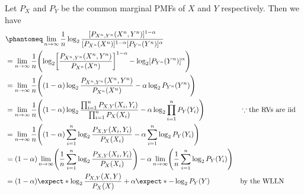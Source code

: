 \documentclass[
  coursecode={MTHE 474},
  assignmentname={Homework \homeworknumber},
  studentnumber=20053722,
  name={Bryan Hoang},
  draft,
]{
  ltxanswer%
}
\begin{document}
  \begin{questions}
    \setcounter{question}{\questionnumber}
    \addtocounter{question}{-1}
    \question[10]\
    \begin{parts}
      \part{}
      \begin{solution}
        Let \(P_{X}\) and \(P_{Y}\) be the common marginal PMFs of \(X\) and \(Y\) respectively. Then we have
        \begin{align*}
                       &\phantomeq \lim_{n\to\infty} \frac{1}{n} \log_{2} \frac{[P_{X^{n},Y^{n}}(X^{n},Y^{n})]^{1-\alpha}}{[P_{X^{n}}(X^{n})]^{1-\alpha}[P_{Y^{n}}(Y^{n})]^{\alpha}}                                                                                            \\
                       &= \lim_{n\to\infty} \frac{1}{n} \Biggl(\log_{2} \biggl[\frac{P_{X^{n},Y^{n}}(X^{n},Y^{n})}{P_{X^{n}}(X^{n})}\biggr]^{1-\alpha} - \log_{2} [P_{Y^{n}}(Y^{n})]^{\alpha}\Biggr)                                                                            \\
                       &= \lim_{n\to\infty} \frac{1}{n} \Biggl((1-\alpha) \log_{2} \frac{P_{X^{n},Y^{n}}(X^{n},Y^{n})}{P_{X^{n}}(X^{n})} - \alpha \log_{2} P_{Y^{n}}(Y^{n})\Biggr)                                                                                              \\
                       &= \lim_{n\to\infty} \frac{1}{n} \Biggl((1-\alpha) \log_{2} \frac{\prod_{i=1}^{n} P_{X,Y}(X_{i},Y_{i})}{\prod_{i=1}^{n} P_{X}(X_{i})} - \alpha \log_{2} \prod_{i=1}^{n} P_{Y}(Y_{i})\Biggr)                           & &\because \text{the RVs are iid} \\
                       &= \lim_{n\to\infty} \frac{1}{n} \Biggl((1-\alpha) \sum_{i=1}^{n} \log_{2} \frac{P_{X,Y}(X_{i},Y_{i})}{P_{X}(X_{i})} - \alpha \sum_{i=1}^{n} \log_{2} P_{Y}(Y_{i})\Biggr)                                                                                \\
                       &= (1-\alpha) \lim_{n\to\infty} \Biggl(\frac{1}{n} \sum_{i=1}^{n} \log_{2} \frac{P_{X,Y}(X_{i},Y_{i})}{P_{X}(X_{i})}\Biggr) - \alpha \lim_{n\to\infty} \Biggl(\frac{1}{n} \sum_{i=1}^{n} \log_{2} P_{Y}(Y_{i})\Biggr)                                    \\
                       &= (1-\alpha) \expect*{\log_{2} \frac{P_{X,Y}(X,Y)}{P_{X}(X)}} + \alpha \expect*{-\log_{2} P_{Y}(Y)}                                                                                                                  & &\text{by the WLLN}              \\

\end{align*}
\end{solution}
\end{parts}
\end{questions}
\end{document}
